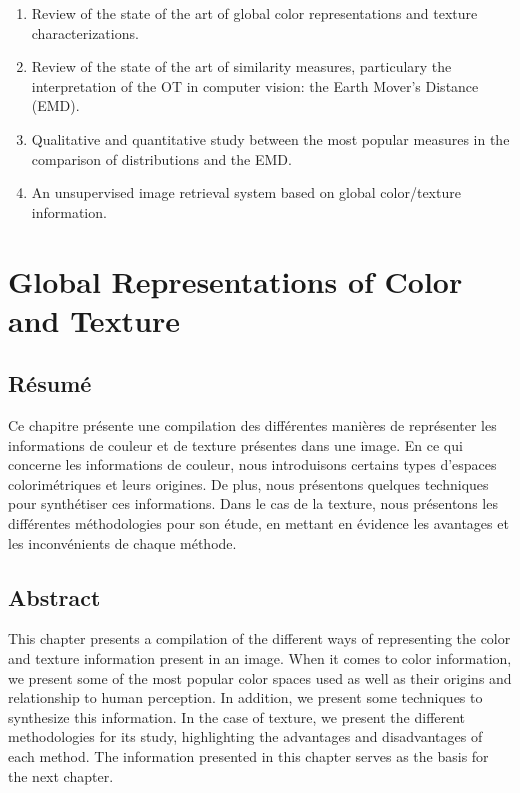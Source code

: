 \begin{enumerate}
	\item Review of the state of the art of global color representations and texture characterizations.
	\item Review of the state of the art of similarity measures, particulary the interpretation of the OT in computer vision: the Earth Mover's Distance (EMD).
	\item Qualitative and quantitative study between the most popular measures in the comparison of distributions and the EMD. 
	\item An unsupervised image retrieval system based on global color/texture information.
\end{enumerate}


\chapter{Global Representations of Color and Texture } \label{ch:color_texure_representations}

\section*{Résumé}
\noindent 
Ce chapitre présente une compilation des différentes manières de représenter les informations de couleur et de texture présentes dans une image. En ce qui concerne les informations de couleur, nous introduisons certains types d'espaces colorimétriques et leurs origines. De plus, nous présentons quelques techniques pour synthétiser ces informations. Dans le cas de la texture, nous présentons les différentes méthodologies pour son étude, en mettant en évidence les avantages et les inconvénients de chaque méthode.
\section*{Abstract}
\noindent 
This chapter presents a compilation of the different ways of representing the color and texture information present in an image. When it comes to color information, we present some of the most popular color spaces used as well as their origins and relationship to human perception. In addition, we present some techniques to synthesize this information. In the case of texture, we present the different methodologies for its study, highlighting the advantages and disadvantages of each method. The information presented in this chapter serves as the basis for the next chapter.

